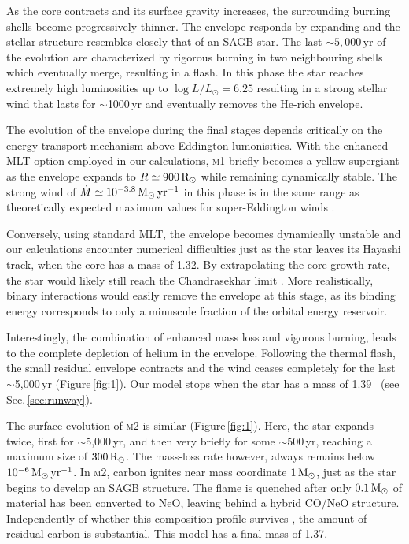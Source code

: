 \documentclass[../../main/thesis_msc.tex]{subfiles}
\begin{document}
As the core contracts and its surface gravity increases, the surrounding burning shells become progressively thinner. The envelope responds by expanding  and the stellar structure resembles closely that of an SAGB star.
The last $\sim 5,000$\,yr of the evolution are characterized by rigorous burning in two neighbouring shells which eventually merge, resulting in a  flash. In this phase the star reaches extremely high luminosities up to $\log{L/L_\odot = 6.25}$ resulting in a strong stellar wind that lasts for $\sim$1000\,yr and eventually removes the He-rich envelope.

The evolution of the envelope during the final stages 
depends critically on the energy transport mechanism above Eddington lumonisities. With the enhanced MLT option 
employed in our calculations, \textsc{m1} briefly 
becomes a yellow supergiant as the envelope  expands to $R\simeq 900\mathrm{\,R_\odot}$ while remaining dynamically stable.
The strong wind of $\dot{M}\simeq10^{-3.8}\mathrm{\,M_{\odot}\,yr^{-1}}$ in this phase is in the same range as theoretically expected maximum values for super-Eddington winds \citep[][]{Owocki:2004zz,Smith2006}.
%

Conversely, using standard MLT, the envelope becomes dynamically unstable and our calculations encounter numerical difficulties just as the star leaves its Hayashi track, when the core has a mass of 1.32\msun.
By extrapolating the core-growth rate, the star would likely still reach the  Chandrasekhar limit \citep[see ][for a similar conclusion]{Woosley:2019sdf}. 
More realistically, binary interactions would easily remove the envelope at this stage, as its binding energy corresponds to only a minuscule fraction of the orbital energy reservoir. 

Interestingly, the combination of enhanced mass loss and vigorous burning, leads to the complete depletion of helium in the envelope. 
Following the thermal flash, the small residual envelope contracts and the wind ceases completely for the last $\sim$5,000\,yr (Figure\,\ref{fig:1}). Our model stops when the star has a mass of 1.39\msun~ (see Sec.\,\ref{sec:runway}).  

The surface evolution of \textsc{m2} is similar (Figure\,\ref{fig:1}). Here, 
the star expands twice, first for $\sim$5,000\,yr, and then very briefly for some 
$\sim$500\,yr, reaching a maximum size of $300\mathrm{\,R_\odot}$. The mass-loss rate however, always remains 
below $10^{-6}\mathrm{\,M_{\odot}\,yr^{-1}}$. In \textsc{m2}, carbon ignites near mass coordinate $1\mathrm{\,M_\odot}$, 
just as the star begins to develop an SAGB structure. The flame is quenched after only 
$0.1\mathrm{\,M_\odot}$ of material has been converted to NeO, leaving behind a hybrid CO/NeO structure. Independently of whether this composition profile survives \citep{brooks2017}, the amount of residual  carbon is substantial. This model has a final mass of 1.37\msun. 
\end{document}

